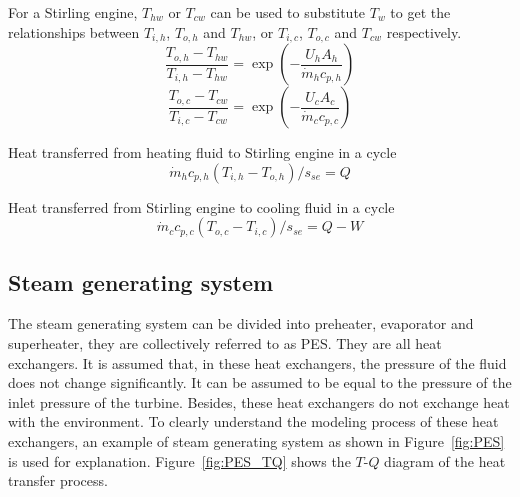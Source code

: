 For a Stirling engine, $T_{hw}$ or $T_{cw}$ can be used to substitute $T_w$ to get the relationships between $T_{i,h}$, $T_{o,h}$ and $T_{hw}$, or $T_{i,c}$, $T_{o,c}$ and $T_{cw}$ respectively.
\begin{equation}
	\frac{T_{o,h}-T_{hw}}{T_{i,h}-T_{hw}}=\exp(-\frac{U_hA_h}{\dot{m}_hc_{p,h}})
	\label{Eq:T_h}
\end{equation}
\begin{equation}
	\frac{T_{o,c}-T_{cw}}{T_{i,c}-T_{cw}}=\exp(-\frac{U_cA_c}{\dot{m}_cc_{p,c}})
	\label{Eq:T_c}
\end{equation}

Heat transferred from heating fluid to Stirling engine in a cycle
\begin{equation}
	\dot{m}_hc_{p,h}(T_{i,h}-T_{o,h})/s_{se} = Q
	\label{Eq:q_h}
\end{equation}

Heat transferred from Stirling engine to cooling fluid in a cycle
\begin{equation}
	\dot{m}_cc_{p,c}(T_{o,c}-T_{i,c})/s_{se} = Q - W
	\label{Eq:q_c}
\end{equation}


\subsection{Steam generating system}
The steam generating system can be divided into preheater, evaporator and superheater, they are collectively referred to as PES. They are all heat exchangers. It is assumed that, in these heat exchangers, the pressure of the fluid does not change significantly. It can be assumed to be equal to the pressure of the inlet pressure of the turbine. Besides, these heat exchangers do not exchange heat with the environment.
To clearly understand the modeling process of these heat exchangers, an example of steam generating system as shown in Figure~\ref{fig:PES} is used for explanation. Figure~\ref{fig:PES_TQ} shows the $T$-$Q$ diagram of the heat transfer process.

